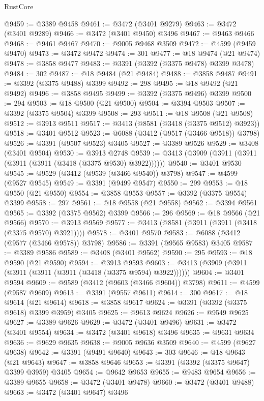 \begin{lexlean}{RustCore}
\begin{coremodule}
@9459 := @3389 @9458
@9461 := @3472 (@3401 @9279)
@9463 := @3472 (@3401 @9289)
@9466 := @3472 (@3401 @9450) @3496
@9467 := @9463 @9466
@9468 := @9461 @9467
@9470 := @9005 @9468 @3509
@9472 := @4599 (@9459 @9470)
@9473 := @3472 @9472
@9474 := 301
@9477 := @18 @9474 (@21 @9474)
@9478 := @3858 @9477
@9483 := @3391 (@3392 (@3375 @9478) @3399 @3478)
@9484 := 302
@9487 := @18 @9484 (@21 @9484)
@9488 := @3858 @9487
@9491 := @3392 (@3375 @9488) @3399
@9492 := 298
@9495 := @18 @9492 (@21 @9492)
@9496 := @3858 @9495
@9499 := @3392 (@3375 @9496) @3399
@9500 := 294
@9503 := @18 @9500 (@21 @9500)
@9504 := @3394 @9503
@9507 := @3392 (@3375 @9504) @3399
@9508 := 293
@9511 := @18 @9508 (@21 @9508)
@9512 := @3913 @9511
@9517 := @3413 (@8581 (@3418 (@3375 @9512) @3923))
@9518 := @3401 @9512
@9523 := @6088 (@3412 (@9517 (@3466 @9518)) @3798)
@9526 := @3391 (@9507 @9523) @3405
@9527 := @3389 @9526
@9529 := @3408 (@3401 @9504)
@9530 := @3913 @2748
@9539 := @3413 (@3909 (@3911 (@3911 (@3911 (@3911 (@3418 (@3375 @9530) @3922))))))
@9540 := @3401 @9530
@9545 := @9529 (@3412 (@9539 (@3466 @9540)) @3798)
@9547 := @4599 (@9527 @9545)
@9549 := @3391 (@9499 @9547)
@9550 := 299
@9553 := @18 @9550 (@21 @9550)
@9554 := @3858 @9553
@9557 := @3392 (@3375 @9554) @3399
@9558 := 297
@9561 := @18 @9558 (@21 @9558)
@9562 := @3394 @9561
@9565 := @3392 (@3375 @9562) @3399
@9566 := 296
@9569 := @18 @9566 (@21 @9566)
@9570 := @3913 @9569
@9577 := @3413 (@8581 (@3911 (@3911 (@3418 (@3375 @9570) @3921))))
@9578 := @3401 @9570
@9583 := @6088 (@3412 (@9577 (@3466 @9578)) @3798)
@9586 := @3391 (@9565 @9583) @3405
@9587 := @3389 @9586
@9589 := @3408 (@3401 @9562)
@9590 := 295
@9593 := @18 @9590 (@21 @9590)
@9594 := @3913 @9593
@9603 := @3413 (@3909 (@3911 (@3911 (@3911 (@3911 (@3418 (@3375 @9594) @3922))))))
@9604 := @3401 @9594
@9609 := @9589 (@3412 (@9603 (@3466 @9604)) @3798)
@9611 := @4599 (@9587 @9609)
@9613 := @3391 (@9557 @9611)
@9614 := 300
@9617 := @18 @9614 (@21 @9614)
@9618 := @3858 @9617
@9624 := @3391 (@3392 (@3375 @9618) @3399 @3959) @3405
@9625 := @9613 @9624
@9626 := @9549 @9625
@9627 := @3389 @9626
@9629 := @3472 (@3401 @9496)
@9631 := @3472 (@3401 @9554)
@9634 := @3472 (@3401 @9618) @3496
@9635 := @9631 @9634
@9636 := @9629 @9635
@9638 := @9005 @9636 @3509
@9640 := @4599 (@9627 @9638)
@9642 := @3391 (@9491 @9640)
@9643 := 303
@9646 := @18 @9643 (@21 @9643)
@9647 := @3858 @9646
@9653 := @3391 (@3392 (@3375 @9647) @3399 @3959) @3405
@9654 := @9642 @9653
@9655 := @9483 @9654
@9656 := @3389 @9655
@9658 := @3472 (@3401 @9478)
@9660 := @3472 (@3401 @9488)
@9663 := @3472 (@3401 @9647) @3496

\end{coremodule}
\end{lexlean}
